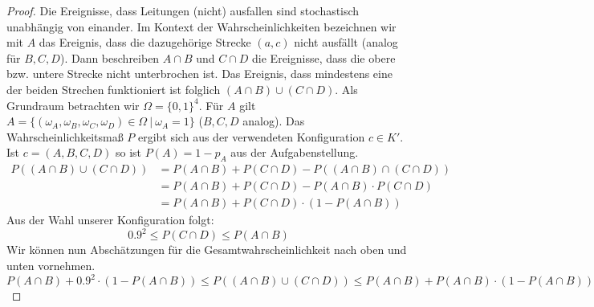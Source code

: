 \documentclass[a4paper]{scrartcl}
\begin{document}
\begin{enumerate}[label=\bfseries\arabic*.]
\begin{proof}
                    Die Ereignisse, dass Leitungen (nicht) ausfallen sind
                    stochastisch unabhängig von einander.
                    Im Kontext der Wahrscheinlichkeiten bezeichnen wir mit $A$
                    das Ereignis, dass die dazugehörige Strecke $(a, c)$ nicht
                    ausfällt (analog für $B, C, D$). 
                    Dann beschreiben $A \cap B$ und $C \cap D$ die Ereignisse,
                    dass die obere bzw. untere Strecke nicht unterbrochen ist.
                    Das Ereignis, dass mindestens eine der beiden Strechen
                    funktioniert ist folglich $(A \cap B) \cup (C \cap D)$.
                    Als Grundraum betrachten wir $\Omega = \{0, 1\}^4$.
                    Für $A$ gilt $A = \{(\omega_A, \omega_B, \omega_C, \omega_D)
                    \in \Omega \ |\ \omega_A = 1\}$ ($B, C, D$ analog).
                    Das Wahrscheinlichkeitsmaß $P$ ergibt sich aus der
                    verwendeten Konfiguration $c \in K'$.
                    Ist $c = (A, B, C, D)$ so ist $P(A) = 1 - p_A$ aus der
                    Aufgabenstellung.
                    \begin{equation*}
                        \begin{split}
                            P((A \cap B) \cup (C \cap D))
                            &= P(A \cap B) + P(C \cap D)
                               - P((A \cap B) \cap (C \cap D)) \\
                            &= P(A \cap B) + P(C \cap D)
                               - P(A \cap B) \cdot P(C \cap D) \\
                            &= P(A \cap B) + P(C \cap D)
                               \cdot (1 - P(A \cap B))
                       \end{split}
                    \end{equation*}
                    Aus der Wahl unserer Konfiguration folgt:
                    \begin{equation*}
                        \num{0.9}^2 \leq P(C \cap D) \leq P(A \cap B)
                    \end{equation*}
                    Wir können nun Abschätzungen für die
                    Gesamtwahrscheinlichkeit nach oben und unten vornehmen.
                    \begin{equation*}
                        P(A \cap B) + \num{0,9}^2 \cdot (1 - P(A \cap B))
                        \leq P((A \cap B) \cup (C \cap D))
                        \leq P(A \cap B) + P(A \cap B) \cdot (1 - P(A \cap B))

\end{equation*}
\end{proof}
\end{enumerate}
\end{document}
